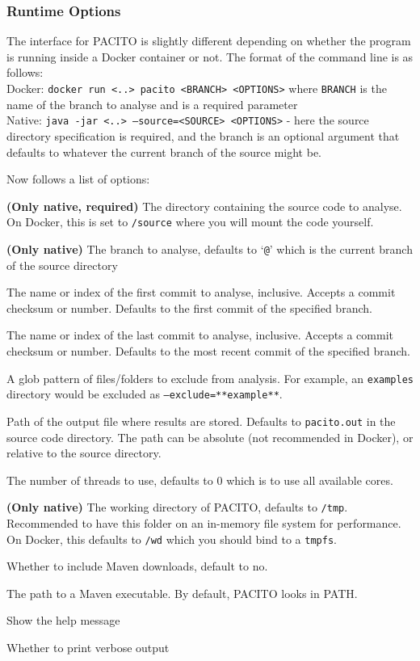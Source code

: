 \subsubsection{Runtime Options}
The interface for PACITO is slightly different depending on whether the program is running inside a Docker container or not. The format of the command line is as follows:\\
Docker: {\tt docker run <..> pacito <BRANCH> <OPTIONS>} where {\tt BRANCH} is the name of the branch to analyse and is a required parameter\\
Native: {\tt java -jar <..> --source=<SOURCE> <OPTIONS>} - here the source directory specification is required, and the branch is an optional argument that defaults to whatever the current branch of the source might be.

Now follows a list of options:
\begin{description}[font=\tt]
\item[-s, --source] {\bf (Only native, required)} The directory containing the source code to analyse. On Docker, this is set to {\tt /source} where you will mount the code yourself.
\item[-b, --branch] {\bf (Only native)} The branch to analyse, defaults to `{\tt @}' which is the current branch of the source directory
\item[--start] The name or index of the first commit to analyse, inclusive. Accepts a commit checksum or number. Defaults to the first commit of the specified branch.
\item[--end] The name or index of the last commit to analyse, inclusive. Accepts a commit checksum or number. Defaults to the most recent commit of the specified branch.
\item[--exclude] A glob pattern of files/folders to exclude from analysis. For example, an {\tt examples} directory would be excluded as {\tt --exclude=**example**}.
\item[-o, --output] Path of the output file where results are stored. Defaults to {\tt pacito.out} in the source code directory. The path can be absolute (not recommended in Docker), or relative to the source directory.
\item[-n, --threads] The number of threads to use, defaults to 0 which is to use all available cores.
\item[-wd, --working-dir] {\bf (Only native)} The working directory of PACITO, defaults to {\tt /tmp}. Recommended to have this folder on an in-memory file system for performance. On Docker, this defaults to {\tt /wd} which you should bind to a {\tt tmpfs}.
\item[--do-mvn, --no-do-mvn] Whether to include Maven downloads, default to no.
\item[--mvn] The path to a Maven executable. By default, PACITO looks in PATH.
\item[-h, --help] Show the help message
\item[-v] Whether to print verbose output
\end{description}


